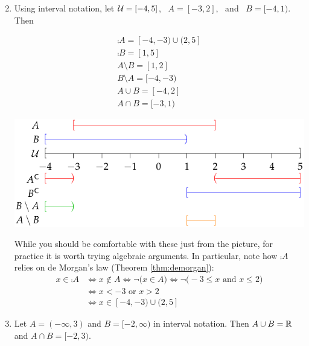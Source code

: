 \begin{examples}{}{}
	\begin{enumerate}\setcounter{enumi}{1}
		\item Using interval notation, let $\mathcal{U}=[-4,5]$, \ $A=[-3,2]$, \ and \ $B=[-4,1)$. Then\par
		\begin{minipage}[t]{0.3\linewidth}\vspace{-13pt}
			\begin{gather*}
			\comp A=[-4,-3)\cup (2,5]\\
			\comp B=[1,5]\\
			A\setminus B=[1,2]\\
			B\setminus A=[-4,-3)\\
			A\cup B=[-4,2]\\
			A\cap B=[-3,1) 
			\end{gather*}
		\end{minipage}
		\hfill
		\begin{minipage}[t]{0.69\linewidth}\vspace{0pt}
			\flushright\includegraphics[scale=0.8]{sets-13-intervalex}
		\end{minipage}
		\smallbreak
		While you should be comfortable with these just from the picture, for practice it is worth trying algebraic arguments. In particular, note how $\comp A$ relies on de Morgan's law (Theorem \ref{thm:demorgan}):
		\begin{align*}
			x\in \comp A&\iff x\notin A\iff \neg\bigl(x\in A\bigr) \iff\neg\bigl(-3\le x \text{ and }x\le 2\bigr)\\
			&\iff x<-3\text{ or }x>2 \tag{de Morgan}\\
			&\iff x\in[-4,-3)\cup (2,5] \tag{remember that $x\in\cU$ always!}
		\end{align*}
		
		\item Let $A=(-\infty,3)$ and $B=[-2,\infty)$ in interval notation. Then $A\cup B=\mathbb{R}$ and $A\cap B=[-2,3)$.
	\end{enumerate}
\end{examples}


